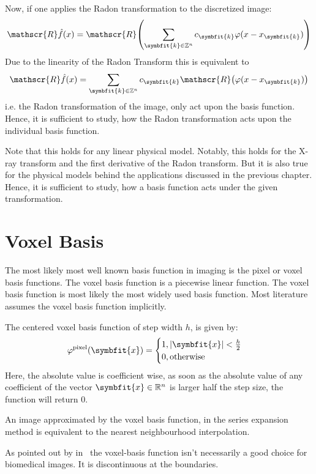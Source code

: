 Now, if one applies the Radon transformation to the discretized image: 
\[ \mathscr{R}\hat{f}(x) = \mathscr{R}\left( \sum_{\symbfit{k} \in \mathbb{Z}^n} c_{\symbfit{k}} \varphi(x - x_{\symbfit{k}}) \right) \]
Due to the linearity of the Radon Transform this is equivalent to \[ \mathscr{R}\hat{f}(x) =  \sum_{\symbfit{k} \in \mathbb{Z}^n} c_{\symbfit{k}}\mathscr{R}\left( \varphi(x - x_{\symbfit{k}}) \right) \]
i.e. the Radon transformation of the image, only act upon the basis function. Hence, it is
sufficient to study, how the Radon transformation acts upon the individual basis function.

Note that this holds for any linear physical model. Notably, this holds for the X-ray transform and
the first derivative of the Radon transform. But it is also true for the physical models behind the
applications discussed in the previous chapter. Hence, it is sufficient to study, how a basis
function acts under the given transformation.

\section{Voxel Basis}\label{sec:voxel_basis}

The most likely most well known basis function in imaging is the pixel or voxel basis functions. The
voxel basis function is a piecewise linear function. The voxel basis function is most likely the
most widely used basis function. Most literature assumes the voxel basis function implicitly.

The centered voxel basis function of step width \(h\), is given by:
\begin{equation}\label{eq:voxel_basis_fn}
	\varphi^{\text{pixel}}(\symbfit{x}) =
	\begin{cases}
		1, \abs{\symbfit{x}} < \frac{h}{2} \\
		0, \text{otherwise}
	\end{cases}
\end{equation}
Here, the absolute value is coefficient wise, as soon as the absolute value of any coefficient of
the vector \(\symbfit{x} \in \mathbb{R}^n\) is larger half the step size, the function will return
\(0\).

An image approximated by the voxel basis function, in the series expansion method is equivalent to
the nearest neighbourhood interpolation.

As pointed out by \citeauthor*{lewitt_multidimensional_1990}
in~\cite{lewitt_multidimensional_1990,lewitt_alternatives_1992} the voxel-basis function isn't
necessarily a good choice for biomedical images. It is discontinuous at the boundaries.

